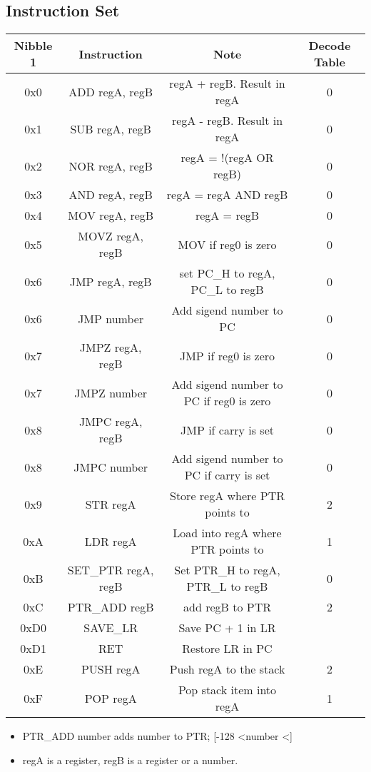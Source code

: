 \documentclass[a4paper, 12pt]{article}
\begin{document}
\begin{center}
		\subsection{Instruction Set}
		\begin{tabular}{|c|c|c|c|}
			\hline
			Nibble 1 & Instruction & Note & Decode Table\\ \hline
			0x0 & ADD regA, regB & regA + regB. Result in regA & 0\\ \hline
			0x1 & SUB regA, regB & regA - regB. Result in regA & 0 \\ \hline
			0x2 & NOR regA, regB & regA = !(regA OR regB) & 0 \\ \hline
			0x3 & AND regA, regB & regA = regA AND regB & 0\\ \hline
			0x4 & MOV regA, regB & regA = regB & 0\\ \hline
			0x5 & MOVZ regA, regB & MOV if reg0 is zero &  0\\ \hline
			0x6 & JMP regA, regB & set PC\_H to regA, PC\_L to regB & 0\\ \hline
			0x6 & JMP number & Add sigend number to PC & 0\\ \hline
			0x7 & JMPZ regA, regB & JMP if reg0 is zero & 0\\ \hline
			0x7 & JMPZ number & Add sigend number to PC if reg0 is zero & 0\\ \hline
			0x8 & JMPC regA, regB & JMP if carry is set & 0\\ \hline
			0x8 & JMPC number & Add sigend number to PC if carry is set & 0\\ \hline
			0x9 & STR regA & Store regA where PTR points to & 2\\ \hline
			0xA & LDR regA & Load into regA where PTR points to & 1\\ \hline
			0xB & SET\_PTR regA, regB & Set PTR\_H to regA, PTR\_L to regB & 0\\ \hline
			0xC & PTR\_ADD regB & add regB to PTR & 2\\ \hline
			0xD0 & SAVE\_LR & Save PC + 1 in LR &   \\ \hline
			0xD1 & RET & Restore LR in PC &   \\ \hline
			0xE & PUSH regA & Push regA to the stack & 2\\ \hline
			0xF & POP regA & Pop stack item into regA & 1\\	\hline
		\end{tabular}	
		\begin{itemize}
			\item PTR\_ADD number adds number to PTR; [-128 \textless \space number \textless {}]
			\item regA is a register, regB is a register or a number.\newline
		\end{itemize}
	\end{center}
	\newpage
\end{document}
